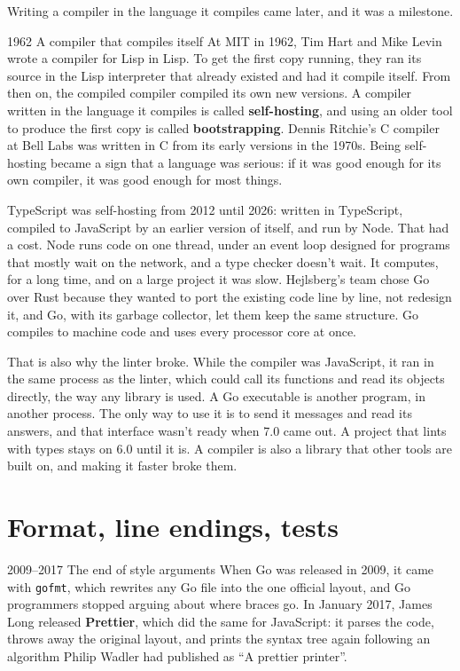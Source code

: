 Writing a compiler in the language it compiles came later, and it was a
milestone.

\begin{history}{1962 \textperiodcentered{} A compiler that compiles itself}
At MIT in 1962, Tim Hart and Mike Levin wrote a compiler for Lisp in Lisp. To
get the first copy running, they ran its source in the Lisp interpreter that
already existed and had it compile itself. From then on, the compiled compiler
compiled its own new versions. A compiler written in the language it compiles
is called \textbf{self-hosting}, and using an older tool to produce the first
copy is called \textbf{bootstrapping}. Dennis Ritchie's C compiler at Bell Labs
was written in C from its early versions in the 1970s. Being self-hosting
became a sign that a language was serious: if it was good enough for its own
compiler, it was good enough for most things.
\end{history}

TypeScript was self-hosting from 2012 until 2026: written in TypeScript,
compiled to JavaScript by an earlier version of itself, and run by Node. That
had a cost. Node runs code on one thread, under an event loop designed for
programs that mostly wait on the network, and a type checker doesn't wait. It
computes, for a long time, and on a large project it was slow. Hejlsberg's team
chose Go over Rust because they wanted to port the existing code line by line,
not redesign it, and Go, with its garbage collector, let them keep the same
structure. Go compiles to machine code and uses every processor core at once.

That is also why the linter broke. While the compiler was JavaScript, it ran in
the same process as the linter, which could call its functions and read its
objects directly, the way any library is used. A Go executable is another
program, in another process. The only way to use it is to send it messages and
read its answers, and that interface wasn't ready when 7.0 came out. A project
that lints with types stays on 6.0 until it is. A compiler is also a library
that other tools are built on, and making it faster broke them.

\section{Format, line endings, tests}

\begin{history}{2009--2017 \textperiodcentered{} The end of style arguments}
When Go was released in 2009, it came with \texttt{gofmt}, which rewrites any
Go file into the one official layout, and Go programmers stopped arguing about
where braces go. In January 2017, James Long released \textbf{Prettier}, which
did the same for JavaScript: it parses the code, throws away the original
layout, and prints the syntax tree again following an algorithm Philip Wadler
had published as ``A prettier printer''.
\end{history}

